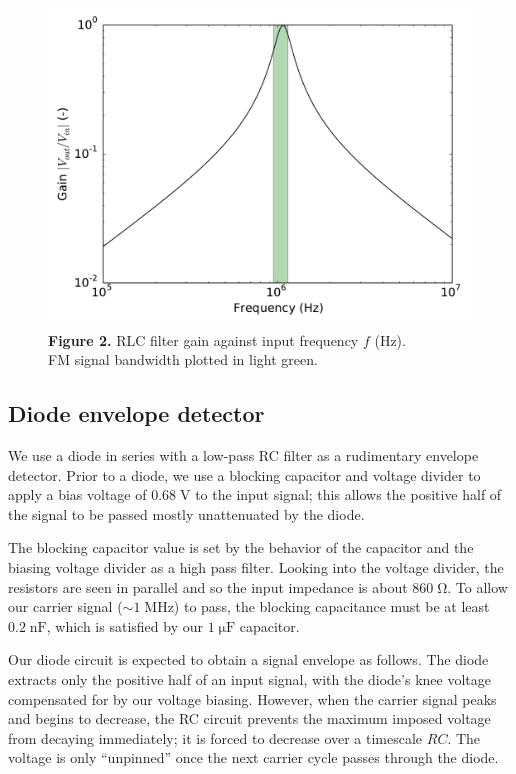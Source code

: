 \documentclass[11pt]{article}
\newcommand {\mt}{\mathrm}
\newcommand {\unit}[1]{\; \mt{#1}}
\begin{document}
\begin{figure}[h]
    \centering
    \includegraphics[scale=0.4]{scripts/rlc_filter_gain.pdf} \\
    \textbf{Figure 2.} RLC filter gain against input frequency $f$ (Hz).\\
    FM signal bandwidth plotted in light green.
\end{figure}

\subsection{Diode envelope detector}

We use a diode in series with a low-pass RC filter as a rudimentary envelope
detector.  Prior to a diode, we use a blocking capacitor and voltage divider to
apply a bias voltage of $0.68 \unit{V}$ to the input signal; this allows the
positive half of the signal to be passed mostly unattenuated by the diode.

The blocking capacitor value is set by the behavior of the capacitor and the
biasing voltage divider as a high pass filter.  Looking into the voltage
divider, the resistors are seen in parallel and so the input impedance is
about $860 \unit{\Omega}$.  To allow our carrier signal ($\sim 1 \unit{MHz}$)
to pass, the blocking capacitance must be at least $0.2 \unit{nF}$,
which is satisfied by our $1 \unit{\mu F}$ capacitor.

Our diode circuit is expected to obtain a signal envelope as follows.  The
diode extracts only the positive half of an input signal, with the diode's knee
voltage compensated for by our voltage biasing.  However, when the carrier
signal peaks and begins to decrease, the RC circuit prevents the maximum
imposed voltage from decaying immediately; it is forced to decrease over a
timescale $RC$.  The voltage is only ``unpinned'' once the next carrier cycle
passes through the diode.
\end{document}
